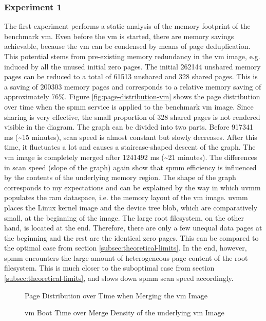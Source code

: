 \subsubsection*{Experiment 1}
\label{subsubsec:ex1}

The first experiment performs a static analysis of the memory footprint of the benchmark \ac{vm}.
Even before the \ac{vm} is started, there are memory savings achievable, because the \ac{vm} can be condensed by means of page deduplication.
This potential stems from pre-existing memory redundancy in the \ac{vm} image, e.g. induced by all the unused initial zero pages.
The initial 262144 unshared memory pages can be reduced to a total of 61513 unshared and 328 shared pages.
This is a saving of 200303 memory pages and corresponds to a relative memory saving of approximately 76\%.
Figure \ref{fig:page-distribution-vm} shows the page distribution over time when the \ac{spmm} service is applied to the benchmark \ac{vm} image.
Since sharing is very effective, the small proportion of 328 shared pages is not rendered visible in the diagram.
The graph can be divided into two parts.
Before 917341 ms (\textasciitilde{}15 minutes), scan speed is almost constant but slowly decreases.
After this time, it fluctuates a lot and causes a staircase-shaped descent of the graph.
The \ac{vm} image is completely merged after 1241492 ms (\textasciitilde{}21 minutes).
The differences in scan speed (slope of the graph) again show that \ac{spmm} efficiency is influenced by the contents of the underlying memory region.
The shape of the graph corresponds to my expectations and can be explained by the way in which \ac{uvmm} populates the \ac{ram} dataspace, i.e. the memory layout of the \ac{vm} image.
\Ac{uvmm} places the Linux kernel image and the device tree blob, which are comparatively small, at the beginning of the image.
The large root filesystem, on the other hand, is located at the end.
Therefore, there are only a few unequal data pages at the beginning and the rest are the identical zero pages.
This can be compared to the optimal case from section \ref{subsec:theoretical-limits}.
In the end, however, \ac{spmm} encounters the large amount of heterogeneous page content of the root filesystem.
This is much closer to the suboptimal case from section \ref{subsec:theoretical-limits}, and slows down \ac{spmm} scan speed accordingly.

\begin{figure}
  \centering
  
  \caption{Page Distribution over Time when Merging the \acs{vm} Image}
  \label{fig:page-distribution-vm}
  \centering
  
  \caption{\acs{vm} Boot Time over Merge Density of the underlying \ac{vm} Image}
  \label{fig:boot-time-vm}
\end{figure}


